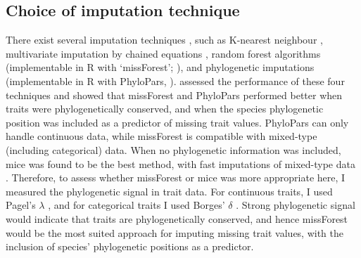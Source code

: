\clearpage

\subsection{Choice of imputation technique}
There exist several imputation techniques \citep{Etard2020, Penone2014, Debastiani2021, Johnson2021}, such as K-nearest neighbour \citep{Troyanskaya2001}, multivariate imputation by chained equations \citep{micepackage}, random forest algorithms (implementable in R with `missForest'; \cite{Stekhoven2012, Stekhoven2016}), and phylogenetic imputations (implementable in R with PhyloPars, \cite{Bruggeman2009}). \citet{Penone2014} assessed the performance of these four techniques and showed that missForest and PhyloPars performed better when traits were phylogenetically conserved, and when the species phylogenetic position was included as a predictor of missing trait values. PhyloPars can only handle continuous data, while missForest is compatible with mixed-type (including categorical) data. When no phylogenetic information was included, mice was found to be the best method, with fast imputations of mixed-type data \citep{Penone2014}. Therefore, to assess whether missForest or mice was more appropriate here, I measured the phylogenetic signal in trait data. For continuous traits, I used Pagel’s $\lambda$ \citep{Pagel1999}, and for categorical traits I used Borges’ $\delta$ \citep{Borges2018}. Strong phylogenetic signal would indicate that traits are phylogenetically conserved, and hence missForest would be the most suited approach for imputing missing trait values, with the inclusion of species’ phylogenetic positions as a predictor. 

